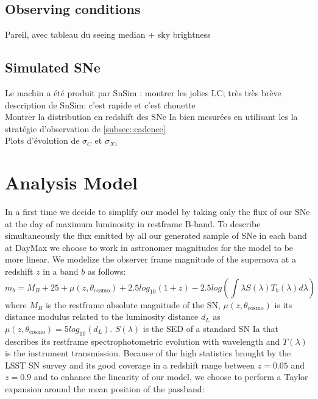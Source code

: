\documentclass[\docopts]{\docclass}
\begin{document}
\subsection{Observing conditions}
Pareil, avec tableau du seeing median + sky brightness

\subsection{Simulated SNe}
\label{ssec::snsim}
Le machin a été produit par SnSim : montrer les jolies LC; très très brève description de SnSim: c'est rapide et c'est chouette \\
Montrer la distribution en redshift des SNe Ia bien mesurées en utilisant les la stratégie d'observation de \ref{subsec::cadence} \\
Plots d'évolution de $\sigma_C$ et $\sigma_{X1}$


\section{Analysis Model}
\label{sec::analysis_model}

In a first time we decide to simplify our model by taking only the flux of our SNe at the day of maximum luminosity in restframe B-band.
To describe simultaneously the flux emitted by all our generated sample of SNe in each band at DayMax we choose to work in astronomer magnitudes for the model to be more linear.
We modelize the observer frame magnitude of the supernova at a redshift $z$ in a band $b$ as follows:
\begin{equation}
\label{eq::raw_model}
 m_b = M_B + 25 + \mu(z, \theta_\text{cosmo}) + 2.5log_{10}(1+z) - 2.5log(\int \lambda S(\lambda) T_b(\lambda) d\lambda) 
\end{equation}
where $M_B$ is the restframe absolute magnitude of the SN, $\mu(z, \theta_\text{cosmo})$ is its distance modulus related to the luminosity distance $d_L$ as $\mu(z, \theta_\text{cosmo}) = 5log_{10}(d_L)$.
$S(\lambda)$ is the SED of a standard SN Ia that describes its restframe spectrophotometric evolution with wavelength and $T(\lambda)$ is the instrument transmission.
Because of the high statistics brought by the LSST SN survey and its good coverage in a redshift range between $z=0.05$ and $z=0.9$ and to enhance the linearity of our model, we choose to perform a Taylor expansion around the mean position of the passband:
\end{document}
